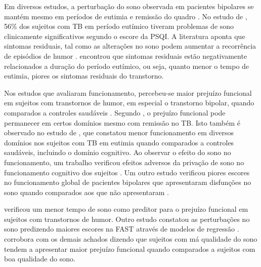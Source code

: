 \documentclass[chapter=TITLE,
               oneside,
               12pt,
               a4paper,
               english,
               brazil]{abntex2}    %
\begin{document}
        Em diversos estudos, a perturbação do sono observada em pacientes bipolares
        se mantém mesmo em períodos de eutimia e remissão do quadro
        \parencite{geoffroy_comment_2017,
        karthick_quality_2015,
        de_la_fuente-tomas_sleep_2018}.
        No estudo de \textcite{keskin_assessment_2018}, 56\% dos sujeitos com TB
        em período eutímico tiveram problemas de sono clinicamente significativos
        segundo o escore da PSQI.
        A literatura aponta que sintomas residuais, tal como as alterações no
        sono podem aumentar a recorrência de episódios de humor
        \parencite{sylvia_sleep_2012,
        kaplan_hypersomnia_2015}.
        \textcite{samalin_course_2016} encontrou que sintomas residuais estão
        negativamente relacionados a duração do período eutímico, ou seja,
        quanto menor o tempo de eutimia, piores os sintomas residuais do
        transtorno.

        Nos estudos que avaliaram funcionamento, percebeu-se maior prejuízo 
        funcional em sujeitos com transtornos de humor, em especial o
        transtorno bipolar, quando comparados a controles saudáveis
        \parencite{reyes_functional_2017,
        kapczinski_cognition_2016,
        rosa_functional_2010,
        rosa_clinical_2009}.
        Segundo \textcite{boland_sleep_2013}, o prejuízo funcional pode
        permanecer em certos domínios mesmo com remissão no TB.
        Isto também é observado no estudo de \textcite{rosa_clinical_2009},
        que constatou menor funcionamento em diversos domínios nos sujeitos
        com TB em eutimia quando comparados a controles saudáveis, incluindo
        o domínio cognitivo.
        Ao observar o efeito do sono no funcionamento, um trabalho verificou
        efeitos adversos da privação de sono no funcionamento cognitivo
        dos sujeitos
        \parencite{harvey_sleep_2009}.
        Um outro estudo verificou piores escores no funcionamento global
        de pacientes bipolares que apresentaram disfunções no sono quando
        comparados aos que não apresentaram 
        \parencite{giglio_sleep_2009}.

        \textcite{slyepchenko_association_2019} verificou um menor tempo de
        sono como preditor para o prejuízo funcional em sujeitos com transtornos
        de humor. Outro estudo constatou as perturbações no sono predizendo
        maiores escores na FAST através de modelos de regressão
        \parencite{walz_daytime_2013}.
        \textcite{lai_familiality_2014} corrobora com os demais achados dizendo
        que sujeitos com má qualidade do sono tendem a apresentar maior
        prejuízo funcional quando comparados a sujeitos com boa qualidade do sono.
\end{document}
